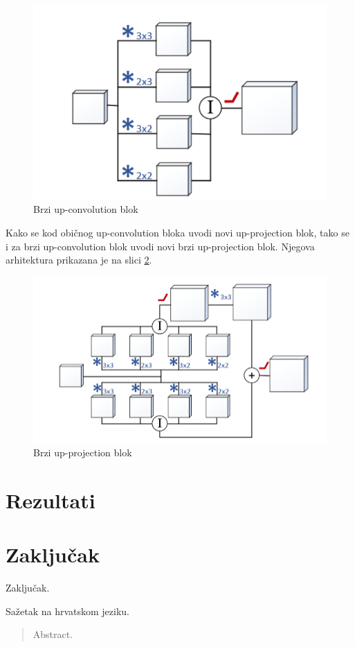\documentclass[times, utf8, zavrsni, numeric]{fer}
\begin{document}
\begin{figure}[htb]
	\centering
	\includegraphics[scale=0.45]{fast-conv.png}
	\caption{Brzi up-convolution blok}
	\label{fig:fastc}
\end{figure}
Kako se kod običnog up-convolution bloka uvodi novi up-projection blok, tako
se i za brzi up-convolution blok uvodi novi brzi up-projection blok. Njegova
arhitektura prikazana je na slici \ref{fig:fastp}.
\begin{figure}[htb]
	\centering
	\includegraphics[scale=0.45]{fast-proj.png}
	\caption{Brzi up-projection blok}
	\label{fig:fastp}
\end{figure}

\chapter{Rezultati}

\chapter{Zaključak}
Zaključak.



\nocite{Cupic-UNN}
\nocite{Goodfellow-et-al-2016}
\nocite{DBLP:journals/corr/HeZRS15}


\begin{sazetak}
Sažetak na hrvatskom jeziku.

\end{sazetak}

\begin{abstract}
Abstract.

\end{abstract}
\end{document}
